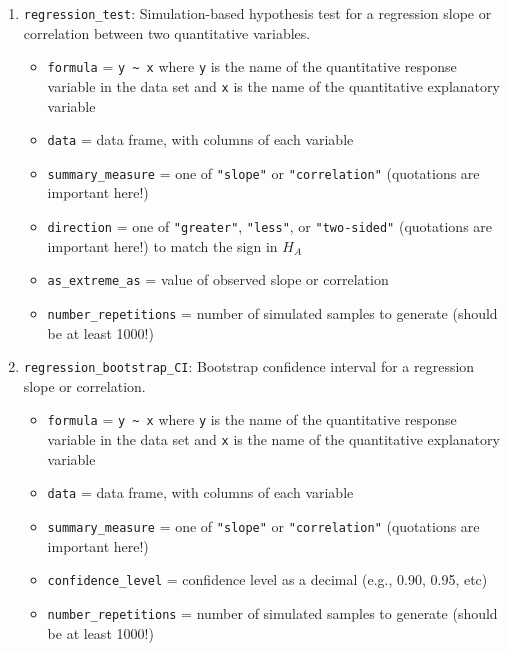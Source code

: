 \documentclass[
  10pt,
  openany]{book}
\providecommand{\tightlist}{%
  \setlength{\itemsep}{0pt}\setlength{\parskip}{0pt}}
\theoremstyle{definition}
\theoremstyle{definition}
\theoremstyle{definition}
\theoremstyle{definition}
\theoremstyle{remark}
\begin{document}
\begin{enumerate}
\def\labelenumi{\arabic{enumi}.}
\item
  \texttt{regression\_test}: Simulation-based hypothesis test for a regression slope or correlation between two quantitative variables.

  \begin{itemize}
  \tightlist
  \item
    \texttt{formula} = \texttt{y\ \textasciitilde{}\ x} where \texttt{y} is the name of the quantitative response variable in the data set and \texttt{x} is the name of the quantitative explanatory variable
  \item
    \texttt{data} = data frame, with columns of each variable
  \item
    \texttt{summary\_measure} = one of \texttt{"slope"} or \texttt{"correlation"} (quotations are important here!)
  \item
    \texttt{direction} = one of \texttt{"greater"}, \texttt{"less"}, or \texttt{"two-sided"} (quotations are important here!) to match the sign in \(H_A\)
  \item
    \texttt{as\_extreme\_as} = value of observed slope or correlation
  \item
    \texttt{number\_repetitions} = number of simulated samples to generate (should be at least 1000!)
  \end{itemize}
\item
  \texttt{regression\_bootstrap\_CI}: Bootstrap confidence interval for a regression slope or correlation.

  \begin{itemize}
  \tightlist
  \item
    \texttt{formula} = \texttt{y\ \textasciitilde{}\ x} where \texttt{y} is the name of the quantitative response variable in the data set and \texttt{x} is the name of the quantitative explanatory variable
  \item
    \texttt{data} = data frame, with columns of each variable
  \item
    \texttt{summary\_measure} = one of \texttt{"slope"} or \texttt{"correlation"} (quotations are important here!)
  \item
    \texttt{confidence\_level} = confidence level as a decimal (e.g., 0.90, 0.95, etc)
  \item
    \texttt{number\_repetitions} = number of simulated samples to generate (should be at least 1000!)
  \end{itemize}
\end{enumerate}
\end{document}
